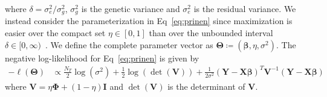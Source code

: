 \documentclass[10pt,letterpaper]{article}
\newcommand{\bX}{\textbf{X}}
\newcommand{\bY}{\textbf{Y}}
\newcommand{\bV}{\textbf{V}}
\newcommand{\bI}{\textbf{I}}
\newcommand{\bTheta}{\boldsymbol{\Theta}}
\newcommand{\bbeta}{\boldsymbol{\beta}}
\newcommand{\bPhi}{\boldsymbol{\Phi}}
\begin{document}
where $\delta = \sigma^2_e / \sigma^2_g$, $\sigma^2_g$ is the genetic variance and $\sigma^2_e$ is the residual variance. We instead consider the parameterization in Eq~\ref{eq:prinen} since maximization is easier over the compact set $\eta \in [0,1]$ than over the unbounded interval $\delta \in [0, \infty)$~\cite{pirinen2013efficient}. We define the complete parameter vector as $\bTheta \coloneqq \left(\bbeta, \eta, \sigma^2 \right)$. The negative log-likelihood for Eq~\ref{eq:prinen} is given by
\begin{align}
-\ell(\bTheta) & \propto \frac{N_T}{2}\log(\sigma^2) + \frac{1}{2}\log\left(\det(\bV)\right) + \frac{1}{2\sigma^2} \left(\bY - \bX \bbeta\right)^T \bV^{-1} \left(\bY - \bX \bbeta\right)  \label{eq:LogLike}
\end{align}
where $\bV = \eta \bPhi + (1-\eta) \bI$ and $\det(\bV)$ is the determinant of $\bV$.
\end{document}
